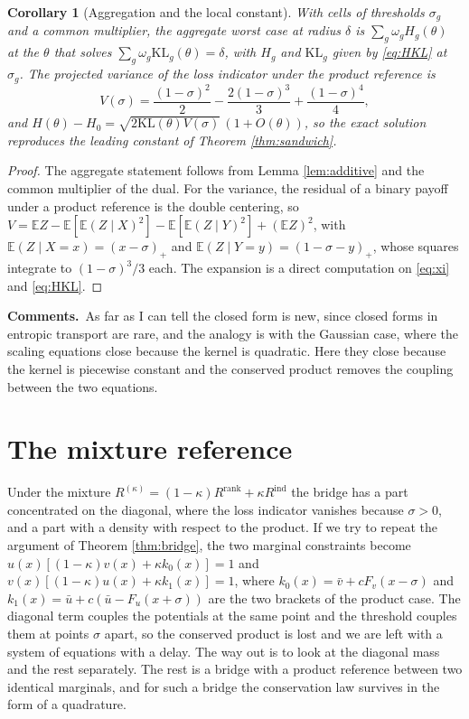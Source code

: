 \documentclass[11pt,a4paper]{article}
\theoremstyle{notesplain}
\newtheorem{corollary}[theorem]{Corollary}
\theoremstyle{notesupright}
\numberwithin{equation}{section}
\newcommand{\comments}{\par\smallskip\noindent\textbf{Comments.}\ }
\newcommand{\KL}{\mathrm{KL}}
\newcommand{\E}{\mathbb{E}}
\begin{document}
\begin{corollary}[Aggregation and the local constant]
\label{cor:bridge}
With cells of thresholds $\sigma_g$ and a common multiplier, the aggregate worst case at radius $\delta$ is $\sum_g\omega_gH_g(\theta)$ at the $\theta$ that solves $\sum_g\omega_g\KL_g(\theta)=\delta$, with $H_g$ and $\KL_g$ given by \eqref{eq:HKL} at $\sigma_g$. The projected variance of the loss indicator under the product reference is
\begin{equation}
V(\sigma)=\frac{(1-\sigma)^2}2-\frac{2(1-\sigma)^3}3+\frac{(1-\sigma)^4}4,
\end{equation}
and $H(\theta)-H_0=\sqrt{2\KL(\theta)V(\sigma)}\,(1+O(\theta))$, so the exact solution reproduces the leading constant of Theorem \ref{thm:sandwich}.
\end{corollary}

\begin{proof}
The aggregate statement follows from Lemma \ref{lem:additive} and the common multiplier of the dual. For the variance, the residual of a binary payoff under a product reference is the double centering, so $V=\E Z-\E[\E(Z\mid X)^2]-\E[\E(Z\mid Y)^2]+(\E Z)^2$, with $\E(Z\mid X=x)=(x-\sigma)_+$ and $\E(Z\mid Y=y)=(1-\sigma-y)_+$, whose squares integrate to $(1-\sigma)^3/3$ each. The expansion is a direct computation on \eqref{eq:xi} and \eqref{eq:HKL}.
\end{proof}

\comments As far as I can tell the closed form is new, since closed forms in entropic transport are rare, and the analogy is with the Gaussian case, where the scaling equations close because the kernel is quadratic. Here they close because the kernel is piecewise constant and the conserved product removes the coupling between the two equations.

\section{The mixture reference}
\label{sec:mixture}
Under the mixture $R^{(\kappa)}=(1-\kappa)R^{\mathrm{rank}}+\kappa R^{\mathrm{ind}}$ the bridge has a part concentrated on the diagonal, where the loss indicator vanishes because $\sigma>0$, and a part with a density with respect to the product. If we try to repeat the argument of Theorem \ref{thm:bridge}, the two marginal constraints become $u(x)[(1-\kappa)v(x)+\kappa k_0(x)]=1$ and $v(x)[(1-\kappa)u(x)+\kappa k_1(x)]=1$, where $k_0(x)=\bar v+cF_v(x-\sigma)$ and $k_1(x)=\bar u+c(\bar u-F_u(x+\sigma))$ are the two brackets of the product case. The diagonal term couples the potentials at the same point and the threshold couples them at points $\sigma$ apart, so the conserved product is lost and we are left with a system of equations with a delay. The way out is to look at the diagonal mass and the rest separately. The rest is a bridge with a product reference between two identical marginals, and for such a bridge the conservation law survives in the form of a quadrature.
\end{document}
